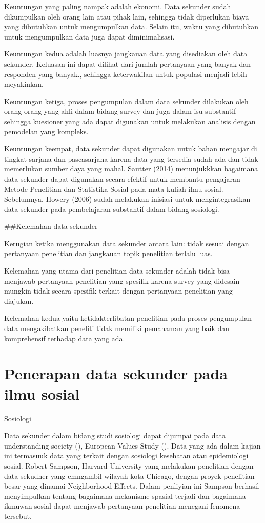 \documentclass[
]{book}
\begin{document}
Keuntungan yang paling nampak adalah ekonomi. Data sekunder sudah dikumpulkan oleh orang lain atau pihak lain, sehingga tidak diperlukan biaya yang dibutuhkan untuk mengumpulkan data. Selain itu, waktu yang dibutuhkan untuk mengumpulkan data juga dapat diminimalisasi.

Keuntungan kedua adalah luasnya jangkauan data yang disediakan oleh data sekunder. Keluasan ini dapat dilihat dari jumlah pertanyaan yang banyak dan responden yang banyak., sehingga keterwakilan untuk populasi menjadi lebih meyakinkan.

Keuntungan ketiga, proses pengumpulan dalam data sekunder dilakukan oleh orang-orang yang ahli dalam bidang survey dan juga dalam isu substantif sehingga kuesioner yang ada dapat digunakan untuk melakukan analisis dengan pemodelan yang kompleks.

Keuntungan keempat, data sekunder dapat digunakan untuk bahan mengajar di tingkat sarjana dan pascasarjana karena data yang tersedia sudah ada dan tidak memerlukan sumber daya yang mahal. Sautter (2014) menunjukkkan bagaimana data sekunder dapat digunakan secara efektif untuk membantu pengajaran Metode Penelitian dan Statistika Sosial pada mata kuliah ilmu sosial. Sebelumnya, Howery (2006) sudah melakukan inisiasi untuk mengintegrasikan data sekunder pada pembelajaran substantif dalam bidang sosiologi.

\#\#Kelemahan data sekunder

Kerugian ketika menggunakan data sekunder antara lain: tidak sesuai dengan pertanyaan penelitian dan jangkauan topik penelitian terlalu luas.

Kelemahan yang utama dari penelitian data sekunder adalah tidak bisa menjawab pertanyaan penelitian yang spesifik karena survey yang didesain mungkin tidak secara spesifik terkait dengan pertanyaan penelitian yang diajukan.

Kelemahan kedua yaitu ketidakterlibatan penelitian pada proses pengumpulan data mengakibatkan peneliti tidak memiliki pemahaman yang baik dan komprehensif terhadap data yang ada.

\hypertarget{penerapan-data-sekunder-pada-ilmu-sosial}{%
\section{Penerapan data sekunder pada ilmu sosial}\label{penerapan-data-sekunder-pada-ilmu-sosial}}

Sosiologi

Data sekunder dalam bidang studi sosiologi dapat dijumpai pada data understanding society (), European Values Study (). Data yang ada dalam kajian ini termasuuk data yang terkait dengan sosiologi kesehatan atau epidemiologi sosial. Robert Sampson, Harvard University yang melakukan penelitian dengan data sekudner yang emngambil wilayah kota Chicago, dengan proyek penelitian besar yang dinamai Neighborhood Effects. Dalam penliyian ini Sampson berhasil menyimpulkan tentang bagaimana mekanisme spasial terjadi dan bagaimana ikmuwan sosial dapat menjawab pertanyaan penelitian menegani fenomena tersebut.
\end{document}
